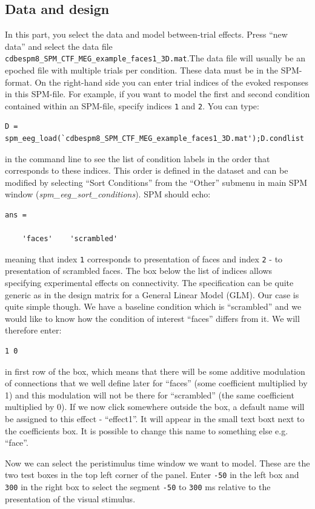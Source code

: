 \subsection{Data and design}
In this part, you select the data and model between-trial effects. Press ``new data'' and select the data file \texttt{cdbespm8\_\-SPM\_\-CTF\_\-MEG\_\-example\_\-faces1\_\-3D.mat}.The data file will usually be an epoched file with multiple trials per condition. These data must be in the SPM-format. On the right-hand side you can enter trial indices of the evoked responses in this SPM-file. For example, if you want to model the first and second condition contained within an SPM-file, specify
indices \texttt{1} and \texttt{2}. You can type:
\begin{verbatim}
D = spm_eeg_load(`cdbespm8_SPM_CTF_MEG_example_faces1_3D.mat');D.condlist
\end{verbatim}
in the command line to see the list of condition labels in the order that corresponds to these indices. This order is defined in the dataset and can be modified by selecting ``Sort Conditions'' from the ``Other'' submenu in main SPM window (\textit{spm\_eeg\_sort\_conditions}). SPM should echo:
\begin{verbatim}
ans = 

    'faces'    'scrambled'
\end{verbatim}
meaning that index \texttt{1} corresponds to presentation of faces and index \texttt{2} - to presentation of scrambled faces. The box below the list of indices allows specifying experimental effects on connectivity. The specification can be quite generic as in the design matrix for a General Linear Model (GLM). Our case is quite simple though. We have a baseline condition which is ``scrambled'' and we would like to know how the condition of interest ``faces'' differs from it. We will therefore enter:
\begin{verbatim}
1 0
\end{verbatim}
in first row of the box, which means that there will be some additive modulation of connections that we well define later for ``faces''  (some coefficient multiplied by 1) and this modulation will not be there for ``scrambled'' (the same coefficient multiplied by 0). If we now click somewhere outside the box, a default name will be assigned to this effect - ``effect1''. It will appear in the small text boxt next to the coefficients box. It is possible to change this name to something else e.g. ``face''.

Now we can select the peristimulus time window we want to model. These are the two test boxes in the top left corner of the panel. Enter \texttt{-50} in the left box and \texttt{300} in the right box to select the segment \texttt{-50} to \texttt{300} ms relative to the presentation of the visual stimulus.  

